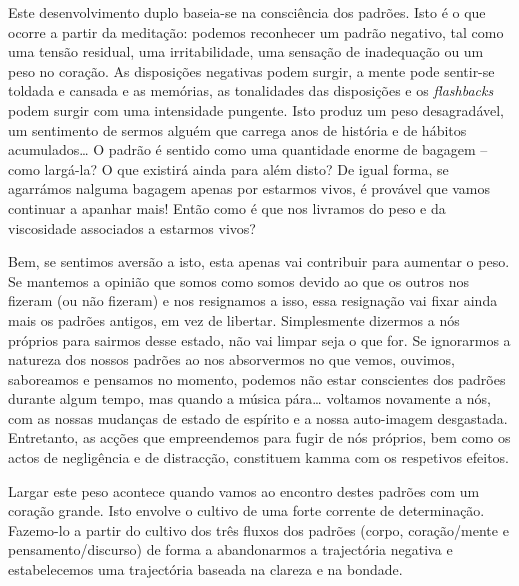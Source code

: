 Este desenvolvimento duplo baseia-se na consciência dos padrões. Isto é o que
ocorre a partir da meditação: podemos reconhecer um padrão negativo, tal como
uma tensão residual, uma irritabilidade, uma sensação de inadequação ou um peso
no coração. As disposições negativas podem surgir, a mente pode sentir-se
toldada e cansada e as memórias, as tonalidades das disposições e os
\emph{flashbacks} podem surgir com uma intensidade pungente. Isto produz um peso
desagradável, um sentimento de sermos alguém que carrega anos de história e de
hábitos acumulados\ldots{} O padrão é sentido como uma quantidade enorme de bagagem
-- como largá-la? O que existirá ainda para além disto? De igual forma, se
agarrámos nalguma bagagem apenas por estarmos vivos, é provável que vamos
continuar a apanhar mais! Então como é que nos livramos do peso e da viscosidade
associados a estarmos vivos?

Bem, se sentimos aversão a isto, esta apenas vai contribuir para aumentar o
peso. Se mantemos a opinião que somos como somos devido ao que os outros nos
fizeram (ou não fizeram) e nos resignamos a isso, essa resignação vai fixar
ainda mais os padrões antigos, em vez de libertar. Simplesmente dizermos a nós
próprios para sairmos desse estado, não vai limpar seja o que for. Se ignorarmos
a natureza dos nossos padrões ao nos absorvermos no que vemos, ouvimos,
saboreamos e pensamos no momento, podemos não estar conscientes dos padrões
durante algum tempo, mas quando a música pára\ldots{} voltamos novamente a nós, com
as nossas mudanças de estado de espírito e a nossa auto-imagem desgastada.
Entretanto, as acções que empreendemos para fugir de nós próprios, bem como os
actos de negligência e de distracção, constituem kamma com os respetivos
efeitos.

Largar este peso acontece quando vamos ao encontro destes padrões com um coração
grande.
Isto envolve o cultivo de uma forte corrente de determinação. Fazemo-lo a partir
do cultivo dos três fluxos dos padrões (corpo, coração/mente e
pensamento/discurso) de forma a abandonarmos a trajectória negativa e
estabelecemos uma trajectória baseada na clareza e na bondade.


